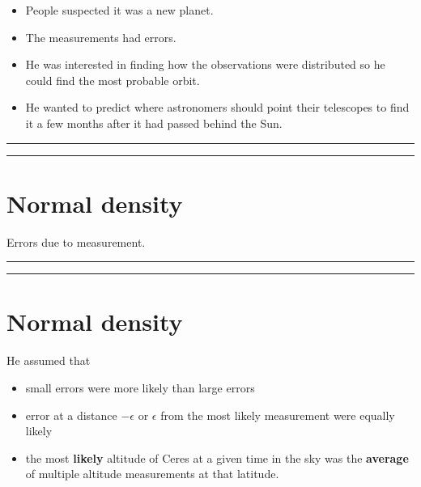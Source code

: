 \documentclass[
]{book}
\providecommand{\tightlist}{%
  \setlength{\itemsep}{0pt}\setlength{\parskip}{0pt}}
\begin{document}
\begin{itemize}
\tightlist
\item
  People suspected it was a new planet.
\item
  The measurements had errors.
\item
  He was interested in finding how the observations were distributed so he could find the most probable orbit.
\item
  He wanted to predict where astronomers should point their telescopes to find it a few months after it had passed behind the Sun.
\end{itemize}

\begin{center}\rule{0.5\linewidth}{0.5pt}\end{center}

\begin{center}\rule{0.5\linewidth}{0.5pt}\end{center}

\hypertarget{normal-density-1}{%
\section{Normal density}\label{normal-density-1}}

Errors due to measurement.

\begin{center}\rule{0.5\linewidth}{0.5pt}\end{center}

\begin{center}\rule{0.5\linewidth}{0.5pt}\end{center}

\hypertarget{normal-density-2}{%
\section{Normal density}\label{normal-density-2}}

He assumed that

\begin{itemize}
\tightlist
\item
  small errors were more likely than large errors
\item
  error at a distance \(-\epsilon\) or \(\epsilon\) from the most likely measurement were equally likely
\item
  the most \textbf{likely} altitude of Ceres at a given time in the sky was the \textbf{average} of multiple altitude measurements at that latitude.
\end{itemize}
\end{document}
